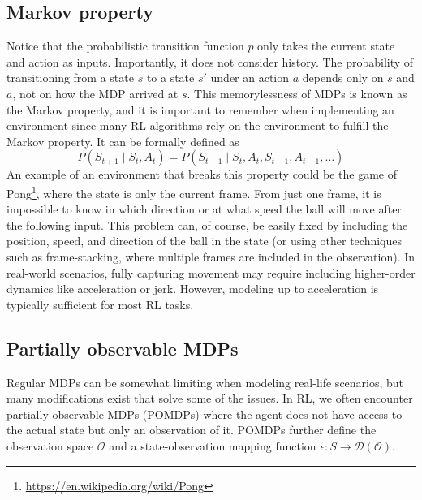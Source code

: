\documentclass[
  digital,     %
  oneside,     %
  nosansbold,  %
  nocolorbold, %
  lof,         %
  lot,         %
]{fithesis4}
\begin{document}
\subsection{Markov property}
\label{subsec:markov_property}
Notice that the probabilistic transition function $p$ only takes the current state and action as inputs. Importantly, it does not consider history. The probability of transitioning from a state $s$ to a state $s'$ under an action $a$ depends only on $s$ and $a$, not on how the MDP arrived at $s$. This memorylessness of MDPs is known as the Markov property, and it is important to remember when implementing an environment since many RL algorithms rely on the environment to fulfill the Markov property. It can be formally defined as
\begin{equation}
P(S_{t+1}\mid S_t,A_t)=P(S_{t+1}\mid S_t,A_t,S_{t-1},A_{t-1}, \dotsc)
\end{equation}
An example of an environment that breaks this property could be the game of Pong\footnote{\url{https://en.wikipedia.org/wiki/Pong}}, where the state is only the current frame. From just one frame, it is impossible to know in which direction or at what speed the ball will move after the following input. This problem can, of course, be easily fixed by including the position, speed, and direction of the ball in the state (or using other techniques such as frame-stacking, where multiple frames are included in the observation). In real-world scenarios, fully capturing movement may require including higher-order dynamics like acceleration or jerk. However, modeling up to acceleration is typically sufficient for most RL tasks.

\subsection{Partially observable MDPs}
Regular MDPs can be somewhat limiting when modeling real-life scenarios, but many modifications exist that solve some of the issues. In RL, we often encounter partially observable MDPs (POMDPs) where the agent does not have access to the actual state but only an observation of it. POMDPs further define the observation space $\mathcal{O}$ and a state-observation mapping function $\epsilon \colon S \to \mathcal{D}(\mathcal{O})$.
\end{document}
